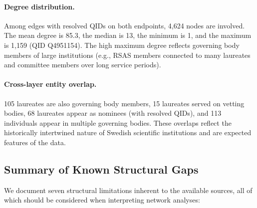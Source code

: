 \paragraph{Degree distribution.} Among edges with resolved QIDs on both
endpoints, 4{,}624 nodes are involved. The mean degree is 85.3, the median
is 13, the minimum is 1, and the maximum is 1{,}159 (QID Q4951154). The
high maximum degree reflects governing body members of large institutions
(e.g., RSAS members connected to many laureates and committee members over
long service periods).

\paragraph{Cross-layer entity overlap.} 105 laureates are also governing
body members, 15 laureates served on vetting bodies, 68 laureates appear
as nominees (with resolved QIDs), and 113 individuals appear in multiple
governing bodies. These overlaps reflect the historically intertwined nature
of Swedish scientific institutions and are expected features of the data.

\subsection{Summary of Known Structural Gaps}\label{sec:gaps}

We document seven structural limitations inherent to the available sources,
all of which should be considered when interpreting network analyses:

